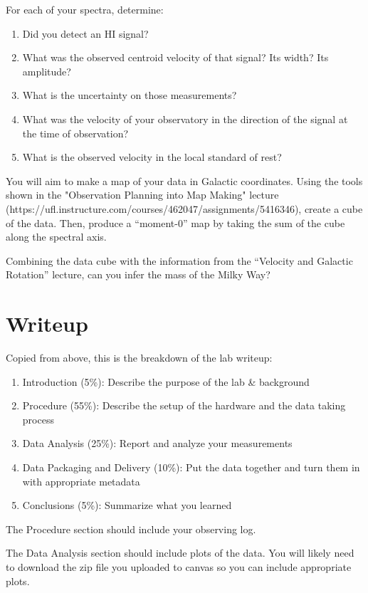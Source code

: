 \documentclass[11pt]{article}
\begin{document}
For each of your spectra, determine:
\begin{enumerate}
    \item Did you detect an HI signal?
    \item What was the observed centroid velocity of that signal?  Its width?  Its amplitude?
    \item What is the uncertainty on those measurements?
    \item What was the velocity of your observatory in the direction of the signal
        at the time of observation?
    \item What is the observed velocity in the local standard of rest?
\end{enumerate}

You will aim to make a map of your data in Galactic coordinates.
Using the tools shown in the "Observation Planning into Map Making" lecture
(https://ufl.instructure.com/courses/462047/assignments/5416346),
create a cube of the data.
Then, produce a ``moment-0'' map by taking the sum of the cube along the spectral
axis.

Combining the data cube with the information from the ``Velocity and Galactic
Rotation'' lecture, can you infer the mass of the Milky Way?


\section{Writeup}

Copied from above, this is the breakdown of the lab writeup:
\begin{enumerate}
    \item Introduction (5\%): Describe the purpose of the lab \& background
    \item Procedure (55\%): Describe the setup of the hardware and the data taking process
    \item Data Analysis (25\%):  Report and analyze your measurements
    \item Data Packaging and Delivery (10\%): Put the data together and turn them in with appropriate metadata
    \item Conclusions (5\%): Summarize what you learned
\end{enumerate}


The Procedure section should include your observing log.

The Data Analysis section should include plots of the data.
You will likely need to download the zip file you uploaded to canvas
so you can include appropriate plots.
\end{document}

